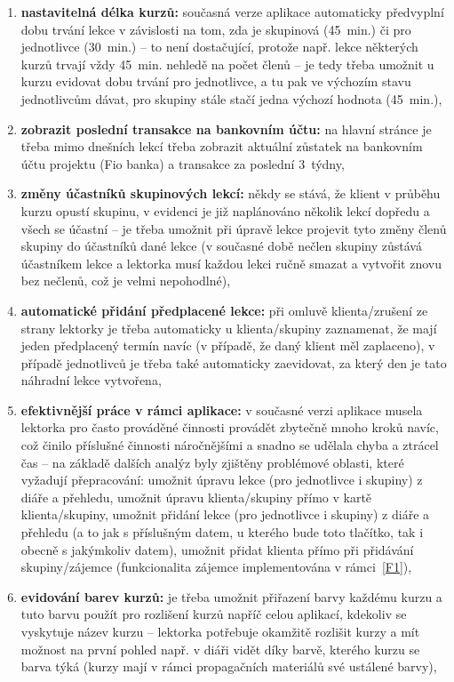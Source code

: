 \begin{enumerate}[label=\textbf{F\arabic*}]
    \item \label{F7} \textbf{nastavitelná délka kurzů:} současná verze aplikace automaticky předvyplní dobu trvání lekce v závislosti na tom, zda je skupinová (45~min.) či pro jednotlivce (30~min.) -- to není dostačující, protože např. lekce některých kurzů trvají vždy 45~min. nehledě na počet členů -- je tedy třeba umožnit u kurzu evidovat dobu trvání pro jednotlivce, a tu pak ve výchozím stavu jednotlivcům dávat, pro skupiny stále stačí jedna výchozí hodnota (45~min.),
    \item \label{F8} \textbf{zobrazit poslední transakce na bankovním účtu:} na hlavní stránce je třeba mimo dnešních lekcí třeba zobrazit aktuální zůstatek na bankovním účtu projektu (Fio banka) a transakce za poslední 3~týdny,
    \item \label{F9} \textbf{změny účastníků skupinových lekcí:} někdy se stává, že klient v průběhu kurzu opustí skupinu, v evidenci je již naplánováno několik lekcí dopředu a všech se účastní -- je třeba umožnit při úpravě lekce projevit tyto změny členů skupiny do účastníků dané lekce (v současné době nečlen skupiny zůstává účastníkem lekce a lektorka musí každou lekci ručně smazat a vytvořit znovu bez nečlenů, což je velmi nepohodlné),
    \item \label{F10} \textbf{automatické přidání předplacené lekce:} při omluvě klienta/zrušení ze strany lektorky je třeba automaticky u klienta/skupiny zaznamenat, že mají jeden předplacený termín navíc (v případě, že daný klient měl zaplaceno), v případě jednotlivců je třeba také automaticky zaevidovat, za který den je tato náhradní lekce vytvořena,
    \item \label{F11} \textbf{efektivnější práce v rámci aplikace:} v současné verzi aplikace musela lektorka pro často prováděné činnosti provádět zbytečně mnoho kroků navíc, což činilo příslušné činnosti náročnějšími a snadno se udělala chyba a ztrácel čas -- na základě dalších analýz byly zjištěny problémové oblasti, které vyžadují přepracování: umožnit úpravu lekce (pro jednotlivce i skupiny) z diáře a přehledu, umožnit úpravu klienta/skupiny přímo v kartě klienta/skupiny, umožnit přidání lekce (pro jednotlivce i skupiny) z diáře a přehledu (a to jak s příslušným datem, u kterého bude toto tlačítko, tak i obecně s jakýmkoliv datem), umožnit přidat klienta přímo při přidávání skupiny/zájemce (funkcionalita zájemce implementována v rámci~\ref{F1}),
    \item \label{F12} \textbf{evidování barev kurzů:} je třeba umožnit přiřazení barvy každému kurzu a tuto barvu použít pro rozlišení kurzů napříč celou aplikací, kdekoliv se vyskytuje název kurzu -- lektorka potřebuje okamžitě rozlišit kurzy a mít možnost na první pohled např. v diáři vidět díky barvě, kterého kurzu se barva týká (kurzy mají v rámci propagačních materiálů své ustálené barvy),

\end{enumerate}
